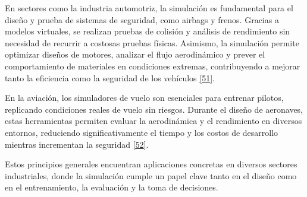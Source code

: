 \documentclass[12pt,oneside]{templates/unerthesis}
\begin{document}
En sectores como la industria automotriz, la simulación es fundamental para el diseño y prueba de sistemas de seguridad, como airbags y frenos. Gracias a modelos virtuales, se realizan pruebas de colisión y análisis de rendimiento sin necesidad de recurrir a costosas pruebas físicas. Asimismo, la simulación permite optimizar diseños de motores, analizar el flujo aerodinámico y prever el comportamiento de materiales en condiciones extremas, contribuyendo a mejorar tanto la eficiencia como la seguridad de los vehículos \protect\hyperlink{ref-stork_towards_2008}{{[}51{]}}.

En la aviación, los simuladores de vuelo son esenciales para entrenar pilotos, replicando condiciones reales de vuelo sin riesgos. Durante el diseño de aeronaves, estas herramientas permiten evaluar la aerodinámica y el rendimiento en diversos entornos, reduciendo significativamente el tiempo y los costos de desarrollo mientras incrementan la seguridad \protect\hyperlink{ref-jentsch_simulation_2017}{{[}52{]}}.

Estos principios generales encuentran aplicaciones concretas en diversos sectores industriales, donde la simulación cumple un papel clave tanto en el diseño como en el entrenamiento, la evaluación y la toma de decisiones.

\begin{table}[!h]
\centering
\caption{\label{tab:unnamed-chunk-2}Aplicaciones de la simulación en distintos sectores}
\centering
{}
\end{table}
\end{document}
